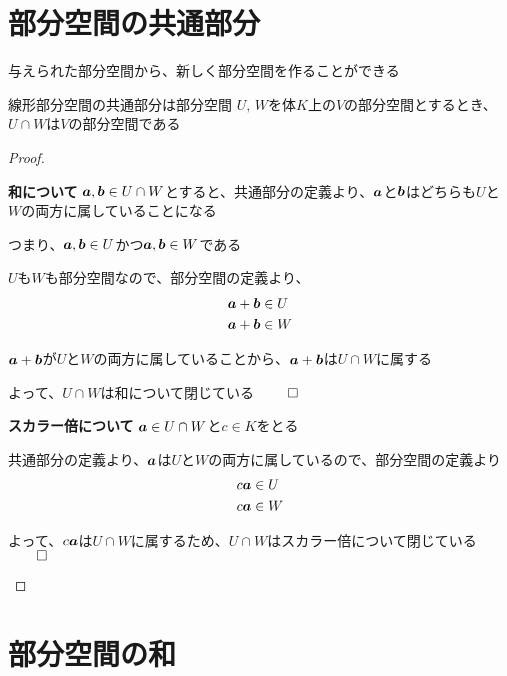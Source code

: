 \documentclass[../../../topic_linear-algebra]{subfiles}
\begin{document}
\sectionline
\section{部分空間の共通部分}

与えられた部分空間から、新しく部分空間を作ることができる

\begin{theorem}{線形部分空間の共通部分は部分空間}
  $U,\,W$を体$K$上の$V$の部分空間とするとき、$U \cap W$は$V$の部分空間である
\end{theorem}

\begin{proof}
  \begin{subpattern}{\bfseries 和について}
    $\vb*{a}, \vb*{b} \in U \cap W$とすると、共通部分の定義より、$\vb*{a}$と$\vb*{b}$はどちらも$U$と$W$の両方に属していることになる

    つまり、$\vb*{a}, \vb*{b} \in U$かつ$\vb*{a}, \vb*{b} \in W$である

    \br

    $U$も$W$も部分空間なので、部分空間の定義より、
    \begin{align*}
      \vb*{a} + \vb*{b} & \in U \\
      \vb*{a} + \vb*{b} & \in W
    \end{align*}

    $\vb*{a} + \vb*{b}$が$U$と$W$の両方に属していることから、$\vb*{a} + \vb*{b}$は$U \cap W$に属する

    よって、$U \cap W$は和について閉じている $\qed$
  \end{subpattern}

  \begin{subpattern}{\bfseries スカラー倍について}
    $\vb*{a} \in U \cap W$と$c \in K$をとる

    共通部分の定義より、$\vb*{a}$は$U$と$W$の両方に属しているので、部分空間の定義より
    \begin{align*}
      c \vb*{a} & \in U \\
      c \vb*{a} & \in W
    \end{align*}

    よって、$c \vb*{a}$は$U \cap W$に属するため、$U \cap W$はスカラー倍について閉じている $\qed$
  \end{subpattern}
\end{proof}

\sectionline
\section{部分空間の和}
\end{document}

